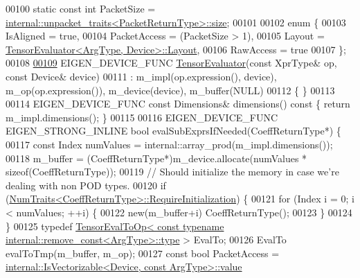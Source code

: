 \begin{DoxyCode}
00100   \textcolor{keyword}{static} \textcolor{keyword}{const} \textcolor{keywordtype}{int} PacketSize = 
      \hyperlink{struct_eigen_1_1internal_1_1unpacket__traits}{internal::unpacket\_traits<PacketReturnType>::size};
00101 
00102   \textcolor{keyword}{enum} \{
00103     IsAligned = \textcolor{keyword}{true},
00104     PacketAccess = (PacketSize > 1),
00105     Layout = \hyperlink{struct_eigen_1_1_tensor_evaluator}{TensorEvaluator<ArgType, Device>::Layout},
00106     RawAccess = \textcolor{keyword}{true}
00107   \};
00108 
\hyperlink{struct_eigen_1_1_tensor_evaluator_3_01const_01_tensor_forced_eval_op_3_01_arg_type_00_01_make_pointer___01_4_00_01_device_01_4_aad4c3dfe2a278cd7c75fa1848153d53e}{00109}   EIGEN\_DEVICE\_FUNC \hyperlink{struct_eigen_1_1_tensor_evaluator_3_01const_01_tensor_forced_eval_op_3_01_arg_type_00_01_make_pointer___01_4_00_01_device_01_4_aad4c3dfe2a278cd7c75fa1848153d53e}{TensorEvaluator}(\textcolor{keyword}{const} XprType& op, \textcolor{keyword}{const} Device& device)
00111       : m\_impl(op.expression(), device), m\_op(op.expression()), m\_device(device), m\_buffer(NULL)
00112   \{ \}
00113 
00114   EIGEN\_DEVICE\_FUNC \textcolor{keyword}{const} Dimensions& dimensions()\textcolor{keyword}{ const }\{ \textcolor{keywordflow}{return} m\_impl.dimensions(); \}
00115 
00116   EIGEN\_DEVICE\_FUNC EIGEN\_STRONG\_INLINE \textcolor{keywordtype}{bool} evalSubExprsIfNeeded(CoeffReturnType*) \{
00117     \textcolor{keyword}{const} Index numValues =  internal::array\_prod(m\_impl.dimensions());
00118     m\_buffer = (CoeffReturnType*)m\_device.allocate(numValues * \textcolor{keyword}{sizeof}(CoeffReturnType));
00119     \textcolor{comment}{// Should initialize the memory in case we're dealing with non POD types.}
00120     \textcolor{keywordflow}{if} (\hyperlink{group___core___module_struct_eigen_1_1_num_traits}{NumTraits<CoeffReturnType>::RequireInitialization})
       \{
00121       \textcolor{keywordflow}{for} (Index i = 0; i < numValues; ++i) \{
00122         \textcolor{keyword}{new}(m\_buffer+i) CoeffReturnType();
00123       \}
00124     \}
00125     \textcolor{keyword}{typedef} \hyperlink{class_eigen_1_1_tensor_eval_to_op}{TensorEvalToOp< const typename internal::remove\_const<ArgType>::type}
       > EvalTo;
00126     EvalTo evalToTmp(m\_buffer, m\_op);
00127     \textcolor{keyword}{const} \textcolor{keywordtype}{bool} PacketAccess = 
      \hyperlink{struct_eigen_1_1internal_1_1_is_vectorizable}{internal::IsVectorizable<Device, const ArgType>::value}

\end{DoxyCode}
